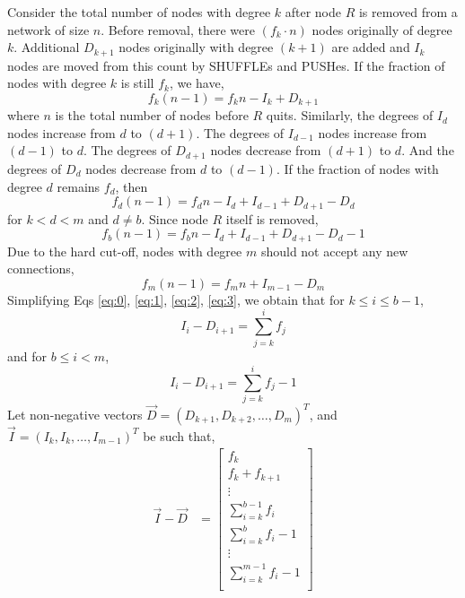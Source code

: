 Consider the total number of nodes with degree $k$ after node $R$ is removed from a network of size $n$. Before removal, there were $(f_k \cdot n)$ nodes originally of degree $k$. Additional $D_{k+1}$ nodes originally with degree $(k+1)$ are added and $I_{k}$ nodes are moved from this count by SHUFFLEs and PUSHes. If the fraction of nodes with degree $k$ is still $f_k$, we have,
\begin{equation} \label{eq:0}
f_k (n-1) = f_k n - I_k + D_{k+1} 
\end{equation}
where $n$ is the total number of nodes before $R$ quits. Similarly, the degrees of $I_{d}$ nodes increase from $d$ to $(d+1)$. The degrees of $I_{d-1}$ nodes increase from $(d-1)$ to $d$. The degrees of $D_{d+1}$ nodes decrease from $(d+1)$ to $d$. And the degrees of $D_d$ nodes decrease from $d$ to $(d-1)$. If the fraction of nodes with degree $d$ remains $f_d$, then
\begin{equation} \label{eq:1}
 f_d (n-1) = f_d n - I_d + I_{d-1} + D_{d+1} - D_d 
\end{equation}
for $k < d < m$ and $d \neq b$. Since node $R$ itself is removed,
\begin{equation} \label{eq:2}
f_b (n-1) = f_b n - I_d + I_{d-1} + D_{d+1} - D_d - 1 
\end{equation}
Due to the hard cut-off, nodes with degree $m$ should not accept any new connections,
\begin{equation} \label{eq:3}
f_m (n-1) = f_m n + I_{m-1} - D_m 
\end{equation}
Simplifying Eqs \ref{eq:0}, \ref{eq:1}, \ref{eq:2}, \ref{eq:3}, we obtain that for $k \leq i \leq b-1$,
\begin{equation} \label{eq:12}
I_{i} - D_{i+1} = \sum_{j=k}^{i} f_j
\end{equation}
and for $  b \leq i < m$,
\begin{equation} \label{eq:13}
I_{i} - D_{i+1} = \sum_{j=k}^{i} f_j - 1
\end{equation}
Let non-negative vectors $\vec{D} = (D_{k+1}, D_{k+2}, \ldots, D_{m})^T$, and $\vec{I} = (I_{k}, I_{k}, \ldots, I_{m-1})^T$ be such that,
\begin{align} \label{eq:vec}
    \vec{I} - \vec{D} &= \begin{bmatrix}
           f_k \\
           f_k+f_{k+1} \\
           \vdots \\
           \sum_{i=k}^{b-1} f_i \\
           \sum_{i=k}^{b} f_i - 1 \\
           \vdots \\
           \sum_{i=k}^{m-1} f_i - 1 \\
         \end{bmatrix}
\end{align}

